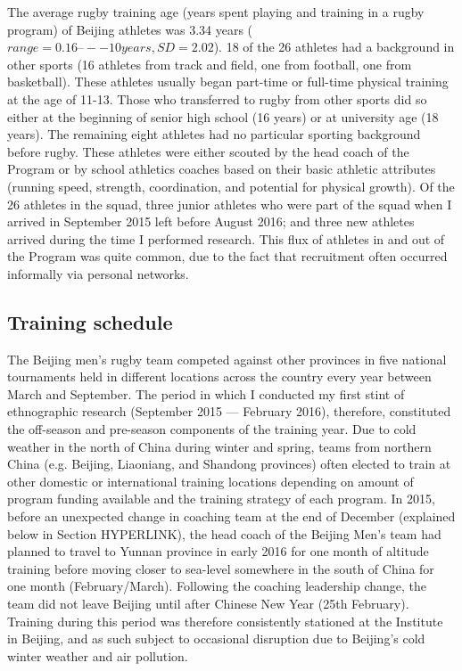 \begin{CJK}{UTF8}{gbsn}
The average rugby training age (years spent playing and training in a rugby program) of Beijing athletes was 3.34 years ($range = 0.16 –-- 10 years, SD = 2.02$).  18 of the 26 athletes had a background in other sports (16 athletes from track and field, one from football, one from basketball).  These athletes usually began part-time or full-time physical training at the age of 11-13.  Those who transferred to rugby from other sports did so either at the beginning of senior high school (16 years) or at university age (18 years).  The remaining eight athletes had no particular sporting background before rugby.  These athletes were either scouted by the head coach of the Program or by school athletics coaches based on their basic athletic attributes (running speed, strength, coordination, and potential for physical growth).  Of the 26 athletes in the squad, three junior athletes who were part of the squad when I arrived in September 2015 left before August 2016; and three new athletes arrived during the time I performed research.  This flux of athletes in and out of the Program was quite common, due to the fact that recruitment often occurred informally via personal networks.




\subsection{Training schedule}

 The Beijing men's rugby team competed against other provinces in five national tournaments held in different locations across the country   every year between March and September. The period in which I conducted my first stint of ethnographic research (September 2015 --- February 2016), therefore, constituted the off-season and pre-season components of the training year.  Due to cold weather in the north of China during winter and spring, teams from northern China (e.g. Beijing, Liaoniang, and Shandong provinces) often elected to train   at other domestic or international training locations depending on amount of program funding available and the training strategy of each program.  In 2015, before an unexpected change in coaching team at the end of December (explained below in Section HYPERLINK), the head coach of the Beijing Men's team had planned to travel to Yunnan province in early 2016 for one month of altitude training before moving closer to sea-level somewhere in the south of China for one month (February/March).  Following the coaching leadership change, the team did not leave Beijing until after Chinese New Year (25th February). Training during this period was therefore consistently stationed at the Institute in Beijing, and as such subject to occasional disruption due to Beijing's cold winter weather and air pollution.


\end{CJK}
